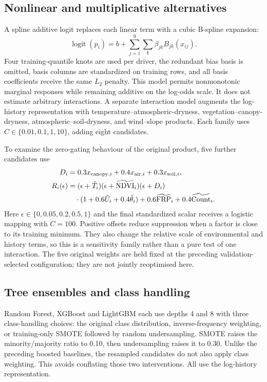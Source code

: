 \documentclass[conference]{IEEEtran}
\begin{document}
\subsection{Nonlinear and multiplicative alternatives}
A spline additive logit replaces each linear term with a cubic B-spline expansion:
\begin{equation}
 \operatorname{logit}(p_i)=b+\sum_{j=1}^{9}\sum_k \beta_{jk}B_{jk}(x_{ij}).
\end{equation}
Four training-quantile knots are used per driver, the redundant bias basis is omitted, basis columns are standardized on training rows, and all basis coefficients receive the same $L_2$ penalty. This model permits nonmonotonic marginal responses while remaining additive on the log-odds scale. It does not estimate arbitrary interactions. A separate interaction model augments the log-history representation with temperature--atmospheric-dryness, vegetation--canopy-dryness, atmospheric--soil-dryness, and wind--slope products. Each family uses $C\in\{0.01,0.1,1,10\}$, adding eight candidates.

To examine the zero-gating behaviour of the original product, five further candidates use
\begin{align}
 D_i&=0.3x_{{\rm canopy},i}+0.4x_{{\rm air},i}+0.3x_{{\rm soil},i},\\
 R_i(\epsilon)&=(\epsilon+\tilde T_i)(\epsilon+\widetilde{\rm NDVI}_i)
 (\epsilon+D_i)\notag\\
 &\quad\cdot(1+0.6\tilde U_i+0.4\tilde\theta_i)
 +0.6\widetilde{\rm FRP}_i+0.4\widetilde{\rm Count}_i.
\end{align}
Here $\epsilon\in\{0,0.05,0.2,0.5,1\}$ and the final standardized scalar receives a logistic mapping with $C=100$. Positive offsets reduce suppression when a factor is close to its training minimum. They also change the relative scale of environmental and history terms, so this is a sensitivity family rather than a pure test of one interaction. The five original weights are held fixed at the preceding validation-selected configuration; they are not jointly reoptimised here.

\subsection{Tree ensembles and class handling}
Random Forest, XGBoost and LightGBM each use depths 4 and 8 with three class-handling choices: the original class distribution, inverse-frequency weighting, or training-only SMOTE followed by random undersampling. SMOTE raises the minority/majority ratio to 0.10, then undersampling raises it to 0.30. Unlike the preceding boosted baselines, the resampled candidates do not also apply class weighting. This avoids conflating those two interventions. All use the log-history representation.
\end{document}
